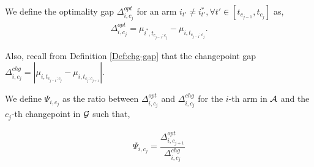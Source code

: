 \begin{definition}
\label{Def:opt-gap}
We define the optimality gap $\Delta^{opt}_{i,c_j}$ for an arm $i_{t'}\neq i^*_{t'},\forall t'\in[t_{c_{j-1}},t_{c_j}]$ as,
\begin{align*}
\Delta^{opt}_{i,c_j}= \mu_{i^*,t_{c_{j-1}:c_j}}-\mu_{i,t_{c_{j-1}:c_j}}.
\end{align*}
\end{definition}

Also, recall from Definition \ref{Def:chg-gap} that the changepoint gap $\Delta^{chg}_{i,c_j}=|\mu_{i,t_{c_{j-1}:c_j}}-\mu_{i,t_{c_j:c_{j+1}}}|$.



\begin{definition}
\label{Def:ratio}
We define $\Psi_{i,c_j}$ as the ratio between $\Delta^{opt}_{i,c_j}$ and $\Delta^{chg}_{i,c_j}$ for the $i$-th arm in $\mathcal{A}$ and the $c_j$-th changepoint in $\mathcal{G}$ such that,

\begin{align*}
\Psi_{i,c_j} = \dfrac{\Delta^{opt}_{i,c_{j+1}}}{\Delta^{chg}_{i,c_j}}
\end{align*}

\end{definition}

 
